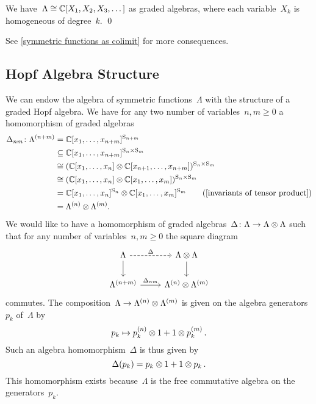 \documentclass[a4paper,11pt]{scrartcl}
\begin{document}
\begin{corollary}
  We have~$\Lambda \cong \mathbb{C}[X_1, X_2, X_3, \dotsc]$ as graded algebras, where each variable~$X_k$ is homogeneous of degree~$k$.
  \qed
\end{corollary}

See \cref{symmetric functions as colimit} for more consequences.



\subsection{Hopf Algebra Structure}

We can endow the algebra of symmetric functions~$\Lambda$ with the structure of a graded Hopf algebra.
We have for any two number of variables~$n, m \geq 0$ a homomorphism of graded algebras
\begin{align*}
  \Delta_{nm}
  \colon
  \Lambda^{(n+m)}
  &=
  \Complex[x_1, \dotsc, x_{n+m}]^{\symm_{n+m}}
  \\
  &\subseteq
  \Complex[x_1, \dotsc, x_{n+m}]^{\symm_n \times \symm_m}
  \\
  &\cong
  ( \Complex[x_1, \dotsc, x_n] \tensor \Complex[x_{n+1}, \dotsc, x_{n+m}] )^{\symm_n \times \symm_m}
  \\
  &\cong
  ( \Complex[x_1, \dotsc, x_n] \tensor \Complex[x_1, \dotsc, x_m] )^{\symm_n \times \symm_m}
  \\
  &=
  \Complex[x_1, \dotsc, x_n]^{\symm_n} \tensor \Complex[x_1, \dotsc, x_m]^{\symm_m}
  \tag{\cref{invariants of tensor product}}
  \\
  &=
  \Lambda^{(n)} \tensor \Lambda^{(m)}.
\end{align*}
We would like to have a homomorphism of graded algebras~$\Delta \colon \Lambda \to \Lambda \otimes \Lambda$ such that for any number of variables~$n, m \geq 0$ the square diagram
\[
  \begin{tikzcd}
    \Lambda
    \arrow[dashed]{r}[above]{\Delta}
    \arrow{d}
    &
    \Lambda \tensor \Lambda
    \arrow{d}
    \\
    \Lambda^{(n+m)}
    \arrow{r}[above]{\Delta_{nm}}
    &
    \Lambda^{(n)} \tensor \Lambda^{(m)}
  \end{tikzcd}
\]
commutes.
The composition~$\Lambda \to \Lambda^{(n)} \otimes \Lambda^{(m)}$ is given on the algebra generators~$p_k$ of~$\Lambda$ by
\[
  p_k \mapsto p^{(n)}_k \otimes 1 + 1 \otimes p^{(m)}_k \,.
\]
Such an algebra homomorphism~$\Delta$ is thus given by
\[
  \Delta(p_k) = p_k \otimes 1 + 1 \otimes p_k \,.  
\]
This homomorphism exists because~$\Lambda$ is the free commutative algebra on the generators~$p_k$.
\end{document}
